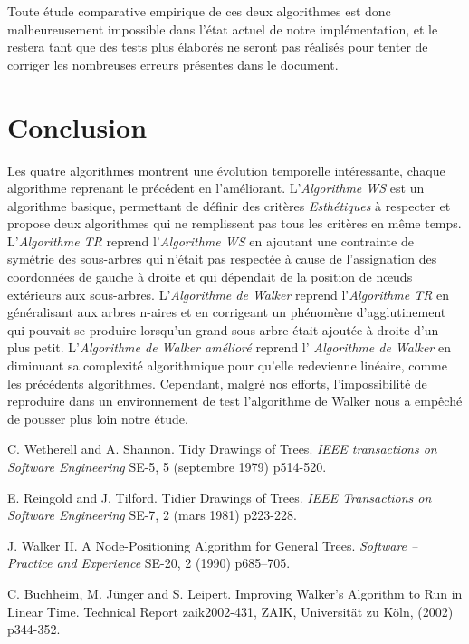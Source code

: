 \documentclass{article}
\begin{document}
Toute étude comparative empirique de ces deux algorithmes est donc malheureusement impossible dans l'état actuel de notre implémentation, et le restera tant que des tests plus élaborés ne seront pas réalisés pour tenter de corriger les nombreuses erreurs présentes dans le document.\\

\newpage
\section{Conclusion}

Les quatre algorithmes montrent une évolution temporelle intéressante, chaque algorithme reprenant le précédent en l'améliorant. L'\emph{Algorithme WS} est un algorithme basique, permettant de définir des critères \emph{Esthétiques} à respecter et propose deux algorithmes qui ne remplissent pas tous les critères en même temps. L'\emph{Algorithme TR} reprend l'\emph{Algorithme WS} en ajoutant une contrainte de symétrie des sous-arbres qui n'était pas respectée à cause de l'assignation des coordonnées de gauche à droite et qui dépendait de la position de n\oe{}uds extérieurs aux sous-arbres. L'\emph{Algorithme de Walker} reprend l'\emph{Algorithme TR} en généralisant aux arbres n-aires et en corrigeant un phénomène d'agglutinement qui pouvait se produire lorsqu'un grand sous-arbre était ajoutée à droite d'un plus petit. L'\emph{Algorithme de Walker amélioré} reprend l' \emph{Algorithme de Walker} en diminuant sa complexité algorithmique pour qu'elle redevienne linéaire, comme les précédents algorithmes. Cependant, malgré nos efforts, l'impossibilité de reproduire dans un environnement de test l'algorithme de Walker nous a empêché de pousser plus loin notre étude.

\newpage
\medskip

\begin{thebibliography}{10}

C. Wetherell and A. Shannon. Tidy Drawings of Trees. \textit{IEEE transactions on Software Engineering} SE-5, 5 (septembre 1979) p514-520.

E. Reingold and J. Tilford. Tidier Drawings of Trees. \textit{IEEE Transactions on Software Engineering} SE-7, 2 (mars 1981) p223-228.

J. Walker II. A Node-Positioning Algorithm for General Trees. \textit{Software – Practice and Experience} SE-20, 2 (1990) p685–705.

C. Buchheim, M. Jünger and S. Leipert. Improving Walker’s Algorithm to Run in Linear Time. Technical Report zaik2002-431, ZAIK, Universität zu Köln, (2002) p344-352.

\end{thebibliography}
\end{document}
